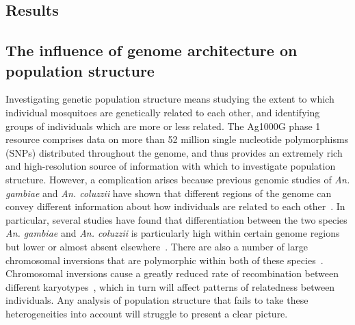 \begin{refsection}
\section{Results}\label{sec:ch4-results}


\subsection{The influence of genome architecture on population structure}\label{subsec:treescan}


Investigating genetic population structure means studying the extent to which individual mosquitoes are genetically related to each other, and identifying groups of individuals which are more or less related.
%
The Ag1000G phase 1 resource comprises data on more than 52 million single nucleotide polymorphisms (SNPs) distributed throughout the genome, and thus provides an extremely rich and high-resolution source of information with which to investigate population structure.
%
However, a complication arises because previous genomic studies of \textit{An. gambiae} and \textit{An. coluzzii} have shown that different regions of the genome can convey different information about how individuals are related to each other~\parencite{Fontaine2014}.
%
In particular, several studies have found that differentiation between the two species \textit{An. gambiae} and \textit{An. coluzzii} is particularly high within certain genome regions but lower or almost absent elsewhere~\parencite{Turner2005,White2010,Weetman2012,Cruickshank2014}.
%
There are also a number of large chromosomal inversions that are polymorphic within both of these species~\parencite{dellaTorre2001,Coluzzi2002}.
%
Chromosomal inversions cause a greatly reduced rate of recombination between different karyotypes~\parencite{Stump2007}, which in turn will affect patterns of relatedness between individuals.
%
Any analysis of population structure that fails to take these heterogeneities into account will struggle to present a clear picture.



\end{refsection}
